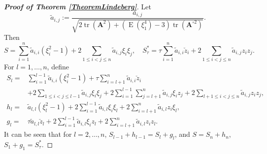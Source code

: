 \documentclass[bj]{imsart}
\DeclareMathOperator{\mytr}{tr}
\DeclareMathOperator{\myE}{E}
\newcommand{\BA}{\mathbf{A}}    \newcommand{\BB}{\mathbf{B}}    \newcommand{\BC}{\mathbf{C}}    \newcommand{\BD}{\mathbf{D}}    \newcommand{\BE}{\mathbf{E}}    \newcommand{\BF}{\mathbf{F}}    \newcommand{\BG}{\mathbf{G}}    \newcommand{\BH}{\mathbf{H}}    \newcommand{\BI}{\mathbf{I}}    \newcommand{\BJ}{\mathbf{J}}    \newcommand{\BK}{\mathbf{K}}    \newcommand{\BL}{\mathbf{L}}
\theoremstyle{plain}
\theoremstyle{definition}
\theoremstyle{remark}
\begin{document}
\begin{proof}[\textbf{Proof of Theorem \ref{TheoremLindeberg}}]
    Let
    \begin{equation*}
        \tilde a_{i,j}:=
        \frac{a_{i,j}}{
            \sqrt{
    2\mytr(\BA^2)
    +
    (\myE(\xi_1^4)-3)\mytr(\BA^{\circ 2} )
            }             
        }
        .
    \end{equation*}
Then
    \begin{equation*}
        S=\sum_{i=1}^n \tilde a_{i,i}(\xi_i^2-1)
        +2\sum_{1\leq i < j \leq n}  \tilde a_{i,j} \xi_i \xi_j,
\quad
        S_\tau^* =\tau \sum_{i=1}^n \tilde a_{i,i}\check z_i
        +2\sum_{1\leq i <j \leq n} \tilde a_{i,j} z_i z_j.
    \end{equation*}
    For $l=1,\ldots, n$, define
    \begin{align*}
        S_l = & 
        \sum_{i=1}^{l-1} \tilde a_{i,i}(\xi_i^2-1)
        +
        \tau\sum_{i=l+1}^{n} \tilde a_{i,i}  \check  z_i
        \\
        &+2\sum_{1\leq i <j \leq l-1}  \tilde a_{i,j} \xi_i \xi_j
        +2\sum_{i=1}^{l-1} \sum_{j=l+1}^n \tilde a_{i,j} \xi_i z_j
        +2\sum_{l+1 \leq i < j \leq n}  \tilde a_{i,j} z_i z_j
        ,
        \\
        h_l = & \tilde a_{l,l} (\xi_l^2 -1)
        +2\sum_{i=1}^{l-1} \tilde a_{i,l} \xi_i \xi_l
        +2\sum_{i =l +1}^n \tilde a_{i,l} z_i \xi_l
        ,
        \\
        g_l = &
        \tau \tilde a_{l,l} \check z_l
        +2\sum_{i =1}^{l-1} \tilde a_{i,l} \xi_i z_l
        +2\sum_{i = l+1}^n \tilde a_{i,l} z_i z_l
        .
    \end{align*}
    It can be seen that for $l=2,\ldots, n$, 
    $S_{l-1}+ h_{l-1} =S_{l} + g_{l} $, and
    $S=S_n + h_n$, $S_1 + g_1=S_\tau^*$.


\end{proof}
\end{document}
